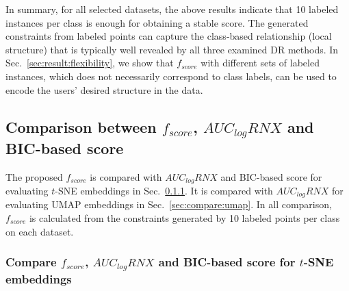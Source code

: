 In summary, for all selected datasets, the above results indicate that 10 labeled instances per class is enough for obtaining a stable score.
The generated constraints from labeled points can capture the class-based relationship (local structure) that is typically well revealed by all three examined DR methods.
In Sec.~\ref{sec:result:flexibility}, we show that $f_{score}$ with different sets of labeled instances, which does not necessarily correspond to class labels,
can be used to encode the users' desired structure in the data.

\subsection{Comparison between $f_{score}$, $AUC_{log}RNX$ and BIC-based score}\label{sec:result:compare}

The proposed $f_{score}$ is compared with $AUC_{log}RNX$ and BIC-based score for evaluating $t$-SNE embeddings in Sec.~\ref{sec:compare:tnse}.
It is compared with $AUC_{log}RNX$ for evaluating UMAP embeddings in Sec.~\ref{sec:compare:umap}.
In all comparison, $f_{score}$ is calculated from the constraints generated by 10 labeled points per class on each dataset.

\subsubsection{Compare $f_{score}$, $AUC_{log}RNX$ and BIC-based score for $t$-SNE embeddings}\label{sec:compare:tnse}

